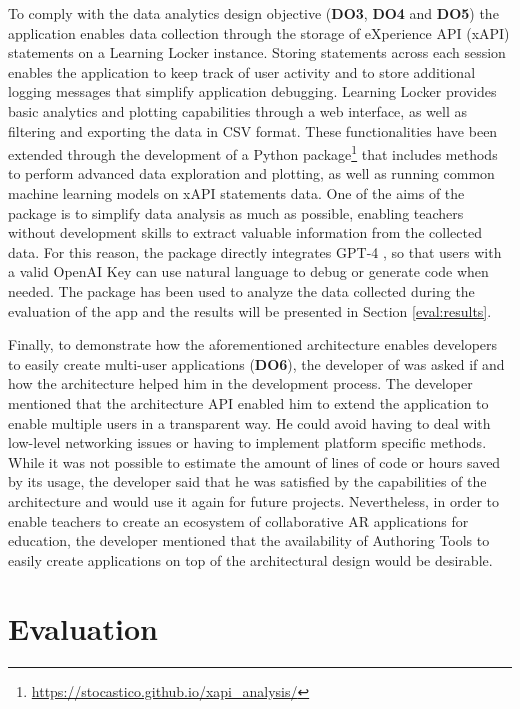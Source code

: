 To comply with the data analytics design objective (\textbf{DO3}, \textbf{DO4} and \textbf{DO5}) the application enables data collection through the storage of eXperience API (xAPI) statements on a Learning Locker instance. 
Storing statements across each session enables the application to keep track of user activity and to store additional logging messages that simplify application debugging.
Learning Locker provides basic analytics and plotting capabilities through a web interface, as well as filtering and exporting the data in CSV format.
These functionalities have been extended through the development of a Python package\footnote{\url{https://stocastico.github.io/xapi_analysis/}} that includes methods to perform advanced data exploration and plotting, as well as running common machine learning models on xAPI statements data.
One of the aims of the package is to simplify data analysis as much as possible, enabling teachers without development skills to extract valuable information from the collected data.
For this reason, the package directly integrates GPT-4 \citep{openai2023gpt4, Osmulski_Ask_AI_-_2023}, so that users with a valid OpenAI Key can use natural language to debug or generate code when needed.
The package has been used to analyze the data collected during the evaluation of the app and the results will be presented in Section \ref{eval:results}.

Finally, to demonstrate how the aforementioned architecture enables developers to easily create multi-user applications (\textbf{DO6}), the developer of \appname{} was asked if and how the architecture helped him in the development process.
The developer mentioned that the architecture API enabled him to extend the application to enable multiple users in a transparent way. He could avoid having to deal with low-level networking issues or having to implement platform specific methods.
While it was not possible to estimate the amount of lines of code or hours saved by its usage, the developer said that he was satisfied by the capabilities of the architecture and would use it again for future projects.
Nevertheless, in order to enable teachers to create an ecosystem of collaborative AR applications for education, the developer mentioned that the availability of Authoring Tools to easily create applications on top of the \arch{} architectural design would be desirable.


\section{Evaluation}\label{eval:evaluation}

